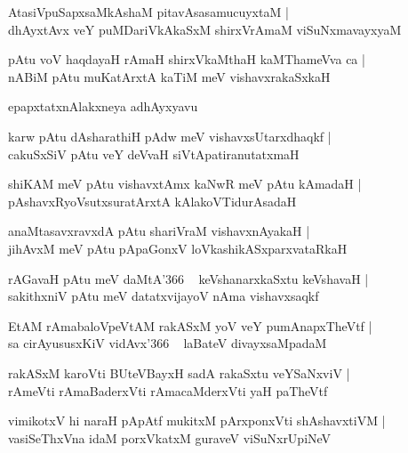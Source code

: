 \documentclass[twoside,12pt,openright]{book}
\newcounter{shloka}[chapter]
\begin{document}
\begin{shloka}%
AtasiVpuSapxsaMkAshaM pitavAsasamucuyxtaM |\\
dhAyxtAvx veY puMDariVkAkaSxM shirxVrAmaM viSuNxmavayxyaM 
\end{shloka}

\begin{shloka}%
pAtu voV haqdayaH rAmaH shirxVkaMthaH kaMThameVva ca |\\
nABiM pAtu muKatArxtA kaTiM meV vishavxrakaSxkaH 
\end{shloka}

\begin{center}
epapxtatxnAlakxneya adhAyxyavu
\end{center}

\begin{shloka}%
karw pAtu dAsharathiH pAdw meV vishavxsUtarxdhaqkf |\\
cakuSxSiV pAtu veY deVvaH siVtApatiranutatxmaH 
\end{shloka}

\begin{shloka}%
shiKAM meV pAtu vishavxtAmx kaNwR meV pAtu kAmadaH |\\
pAshavxRyoVsutxsuratArxtA kAlakoVTidurAsadaH 
\end{shloka}

\begin{shloka}%
anaMtasavxravxdA pAtu shariVraM vishavxnAyakaH |\\
jihAvxM meV pAtu pApaGonxV loVkashikASxparxvataRkaH 
\end{shloka}

\begin{shloka}%
rAGavaH pAtu meV daMtA\char'366 ~ keVshanarxkaSxtu keVshavaH |\\
sakithxniV pAtu meV datatxvijayoV nAma vishavxsaqkf 
\end{shloka}

\begin{shloka}%
EtAM rAmabaloVpeVtAM rakASxM yoV veY pumAnapxTheVtf |\\
sa cirAyususxKiV vidAvx\char'366 ~ laBateV divayxsaMpadaM
\end{shloka}

\begin{shloka}%
rakASxM karoVti BUteVBayxH sadA rakaSxtu veYSaNxviV |\\
rAmeVti rAmaBaderxVti rAmacaMderxVti yaH paTheVtf
\end{shloka}

\begin{shloka}%
vimikotxV hi naraH pApAtf mukitxM pArxponxVti shAshavxtiVM |\\
vasiSeThxVna idaM porxVkatxM guraveV viSuNxrUpiNeV
\end{shloka}
\end{document}
